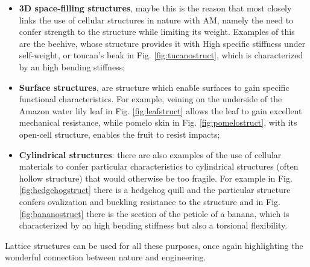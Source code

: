 \begin{itemize}
    \item \textbf{3D space-filling structures}, maybe this is the reason that most closely links the use of cellular structures in nature with AM, namely the need to confer strength to the structure while limiting its weight. Examples of this are the beehive, whose structure provides it with High specific stiffness under self-weight, or toucan's beak in Fig. \ref{fig:tucanostruct}, which is characterized by an high bending stiffness;
    \item \textbf{Surface structures}, are structure which enable surfaces to gain specific functional characteristics. For example, veining on the underside of the Amazon water lily leaf in Fig. \ref{fig:leafstruct} allows the leaf to gain excellent mechanical resistance, while pomelo skin in Fig. \ref{fig:pomelostruct}, with its open-cell structure, enables the fruit to resist impacts;
    \item \textbf{Cylindrical structures}: there are also examples of the use of cellular materials to confer particular characteristics to cylindrical structures (often hollow structure) that would otherwise be too fragile. For example in Fig. \ref{fig:hedgehogstruct} there is a hedgehog quill and the particular structure confers ovalization and buckling resistance to the structure and in Fig. \ref{fig:bananostruct} there is the section of the petiole of a banana, which is characterized by an high bending stiffness but also a torsional flexibility.
\end{itemize}
Lattice structures can be used for all these purposes, once again highlighting the wonderful connection between nature and engineering.
